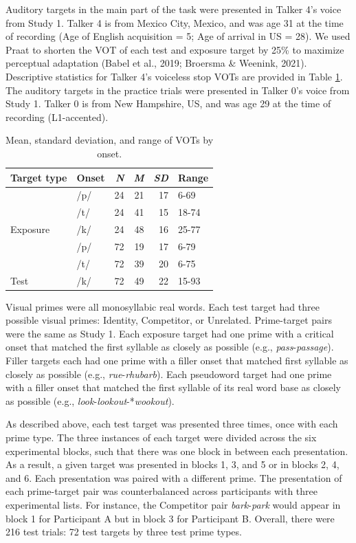 \documentclass[
  12pt,
  twoside]{article}
\begin{document}
Auditory targets in the main part of the task were presented in Talker 4's voice from Study 1.
Talker 4 is from Mexico City, Mexico, and was age 31 at the time of recording (Age of English acquisition = 5; Age of arrival in US = 28).
We used Praat to shorten the VOT of each test and exposure target by 25\% to maximize perceptual adaptation (Babel et al., 2019; Broersma \& Weenink, 2021).
Descriptive statistics for Talker 4's voiceless stop VOTs are provided in Table \ref{tab:eeg-vot-tab}.
The auditory targets in the practice trials were presented in Talker 0's voice from Study 1.
Talker 0 is from New Hampshire, US, and was age 29 at the time of recording (L1-accented).

\begin{table}

\caption{\label{tab:eeg-vot-tab}Mean, standard deviation, and range of VOTs by onset.}
\centering
\begin{tabular}[t]{l|l|r|r|r|l}
\hline
Target type & Onset & \textit{N} & \textit{M} & \textit{SD} & Range\\
\hline
 & /p/ & 24 & 21 & 17 & 6-69\\
\cline{2-6}
 & /t/ & 24 & 41 & 15 & 18-74\\
\cline{2-6}
\multirow{-3}{*}{\raggedright\arraybackslash Exposure} & /k/ & 24 & 48 & 16 & 25-77\\
\cline{1-6}
 & /p/ & 72 & 19 & 17 & 6-79\\
\cline{2-6}
 & /t/ & 72 & 39 & 20 & 6-75\\
\cline{2-6}
\multirow{-3}{*}{\raggedright\arraybackslash Test} & /k/ & 72 & 49 & 22 & 15-93\\
\hline
\end{tabular}
\end{table}

Visual primes were all monosyllabic real words.
Each test target had three possible visual primes: Identity, Competitor, or Unrelated.
Prime-target pairs were the same as Study 1.
Each exposure target had one prime with a critical onset that matched the first syllable as closely as possible (e.g., \emph{pass}-\emph{passage}).
Filler targets each had one prime with a filler onset that matched first syllable as closely as possible (e.g., \emph{rue}-\emph{rhubarb}).
Each pseudoword target had one prime with a filler onset that matched the first syllable of its real word base as closely as possible (e.g., \emph{look}-\emph{lookout}-*\emph{wookout}).

As described above, each test target was presented three times, once with each prime type.
The three instances of each target were divided across the six experimental blocks, such that there was one block in between each presentation.
As a result, a given target was presented in blocks 1, 3, and 5 or in blocks 2, 4, and 6.
Each presentation was paired with a different prime.
The presentation of each prime-target pair was counterbalanced across participants with three experimental lists.
For instance, the Competitor pair \emph{bark}-\emph{park} would appear in block 1 for Participant A but in block 3 for Participant B.
Overall, there were 216 test trials: 72 test targets by three test prime types.
\end{document}
